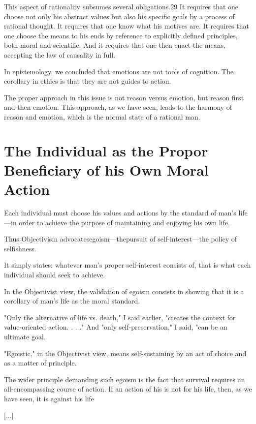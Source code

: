         This aspect of rationality subsumes several obligations.29 It requires that one choose not only his abstract values but also his specific goals by a process of rational thought. It requires that one know what his motives are. It requires that one choose the means to his ends by reference to explicitly defined principles, both moral and scientific. And it requires that one then enact the means, accepting the law of causality in full.

        In epistemology, we concluded that emotions are not tools of cognition. The corollary in ethics is that they are not guides to action.

        The proper approach in this issue is not reason versus emotion, but reason first and then emotion. This approach, as we have seen, leads to the harmony of reason and emotion, which is the normal state of a rational man. 

    \section{The Individual as the Propor Beneficiary of his Own Moral Action}

        Each individual must choose his values and actions by the standard of man's life—in order to achieve the purpose of maintaining and enjoying his own life.

        Thus Objectivism advocatesegoism—thepursuit of self-interest—the policy of selfishness.

        It simply states: whatever man's proper self-interest consists of, that is what each individual should seek to achieve.

        In the Objectivist view, the validation of egoism consists in showing that it is a corollary of man's life as the moral standard.

        "Only the alternative of life vs. death," I said earlier, "creates the context for value-oriented action. . . ." And "only self-preservation," I said, "can be an ultimate goal.

        "Egoistic," in the Objectivist view, means self-sustaining by an act of choice and as a matter of principle.

        The wider principle demanding such egoism is the fact that survival requires an all-encompassing course of action. If an action of his is not for his life, then, as we have seen, it is against his life

        [...]
        
